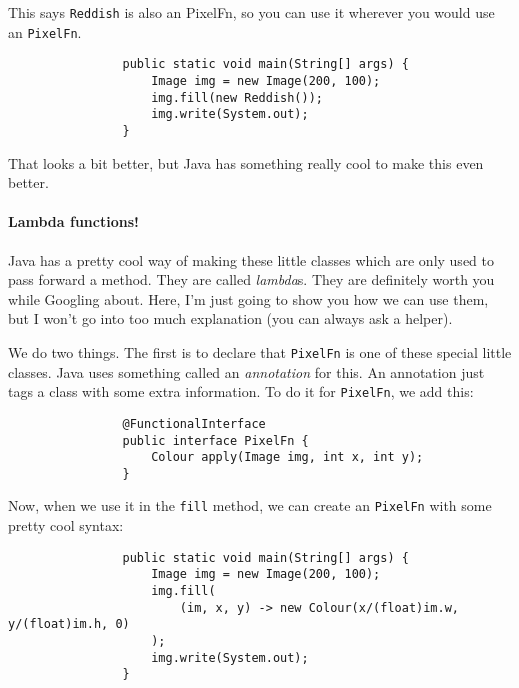 \documentclass{article}
\begin{document}
            This says \texttt{Reddish} is also an PixelFn, so you can use it wherever you would use an \texttt{PixelFn}.

            \begin{verbatim}
                public static void main(String[] args) {
                    Image img = new Image(200, 100);
                    img.fill(new Reddish());
                    img.write(System.out);
                }
            \end{verbatim}
            
            That looks a bit better, but Java has something really cool to make this even better.

        \paragraph{Lambda functions!}
            Java has a pretty cool way of making these little classes which are only used to pass forward a method. They are called
            \emph{lambda}s. They are definitely worth you while Googling about. Here, I'm just going to show you how we can use them, but I
            won't go into too much explanation (you can always ask a helper).
            
            We do two things. The first is to declare that \texttt{PixelFn} is one of these special little classes. Java uses something
            called an \emph{annotation} for this. An annotation just tags a class with some extra information. To do it for
            \texttt{PixelFn}, we add this:
            
            \begin{verbatim}
                @FunctionalInterface
                public interface PixelFn {
                    Colour apply(Image img, int x, int y);
                }
            \end{verbatim}
            
            Now, when we use it in the \texttt{fill} method, we can create an \texttt{PixelFn} with some pretty cool syntax:
            
            \begin{verbatim}
                public static void main(String[] args) {
                    Image img = new Image(200, 100);
                    img.fill(
                        (im, x, y) -> new Colour(x/(float)im.w, y/(float)im.h, 0)
                    );
                    img.write(System.out);
                }
            \end{verbatim}
            
\end{document}
